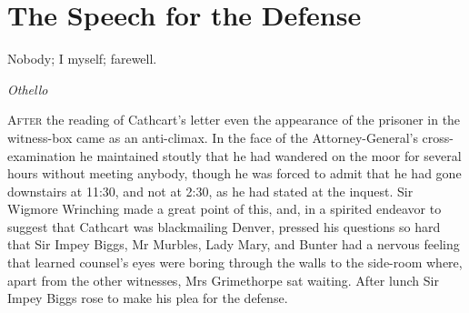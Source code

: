 

\chapter{The Speech for the Defense}

\epigraph{Nobody; I myself; farewell.}{\textit{Othello}}



\lettrine[lines=4]{A}{fter} the reading of Cathcart's letter even the appearance of the prisoner in the witness-box came as an anti-climax. In the face of the Attorney-General's cross-examination he maintained stoutly that he had wandered on the moor for several hours without meeting anybody, though he was forced to admit that he had gone downstairs at 11:30, and not at 2:30, as he had stated at the inquest. Sir Wigmore Wrinching made a great point of this, and, in a spirited endeavor to suggest that Cathcart was blackmailing Denver, pressed his questions so hard that Sir Impey Biggs, Mr Murbles, Lady Mary, and Bunter had a nervous feeling that learned counsel's eyes were boring through the walls to the side-room where, apart from the other witnesses, Mrs Grimethorpe sat waiting. After lunch Sir Impey Biggs rose to make his plea for the defense.

